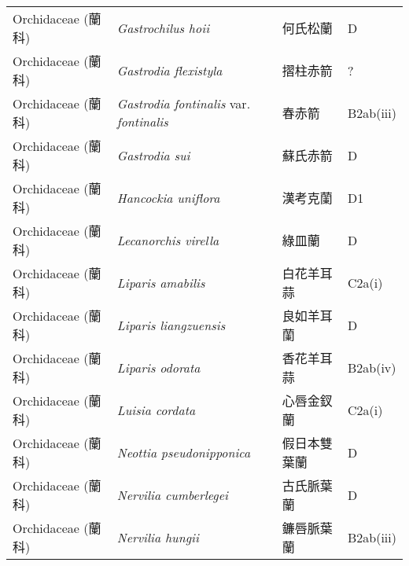 \begin{longtable}{p{3cm}p{5cm}p{3cm}p{4cm}}
    Orchidaceae (蘭科) & \textit{Gastrochilus hoii}  & 何氏松蘭 & D \index{Gastrochilus@\textit{Gastrochilus}!hoii@\textit{hoii}}  \index{何氏松蘭} \\
    Orchidaceae (蘭科) & \textit{Gastrodia flexistyla}  & 摺柱赤箭 & ? \index{Gastrodia@\textit{Gastrodia}!flexistyla@\textit{flexistyla}}  \index{摺柱赤箭} \\
    Orchidaceae (蘭科) & \textit{Gastrodia fontinalis} var. \textit{fontinalis}  & 春赤箭 & B2ab(iii) \index{Gastrodia@\textit{Gastrodia}!fontinalis@\textit{fontinalis}!var. fontinalis@var. \textit{fontinalis}}  \index{春赤箭} \\
    Orchidaceae (蘭科) & \textit{Gastrodia sui}  & 蘇氏赤箭 & D \index{Gastrodia@\textit{Gastrodia}!sui@\textit{sui}}  \index{蘇氏赤箭} \\
    Orchidaceae (蘭科) & \textit{Hancockia uniflora}  & 漢考克蘭 & D1 \index{Hancockia@\textit{Hancockia}!uniflora@\textit{uniflora}}  \index{漢考克蘭} \\
    Orchidaceae (蘭科) & \textit{Lecanorchis virella}  & 綠皿蘭 & D \index{Lecanorchis@\textit{Lecanorchis}!virella@\textit{virella}}  \index{綠皿蘭} \\
    Orchidaceae (蘭科) & \textit{Liparis amabilis}  & 白花羊耳蒜 & C2a(i) \index{Liparis@\textit{Liparis}!amabilis@\textit{amabilis}}  \index{白花羊耳蒜} \\
    Orchidaceae (蘭科) & \textit{Liparis liangzuensis}  & 良如羊耳蘭 & D \index{Liparis@\textit{Liparis}!liangzuensis@\textit{liangzuensis}}  \index{良如羊耳蘭} \\
    Orchidaceae (蘭科) & \textit{Liparis odorata}  & 香花羊耳蒜 & B2ab(iv) \index{Liparis@\textit{Liparis}!odorata@\textit{odorata}}  \index{香花羊耳蒜} \\
    Orchidaceae (蘭科) & \textit{Luisia cordata}  & 心唇金釵蘭 & C2a(i) \index{Luisia@\textit{Luisia}!cordata@\textit{cordata}}  \index{心唇金釵蘭} \\
    Orchidaceae (蘭科) & \textit{Neottia pseudonipponica}  & 假日本雙葉蘭 & D \index{Neottia@\textit{Neottia}!pseudonipponica@\textit{pseudonipponica}}  \index{假日本雙葉蘭} \\
    Orchidaceae (蘭科) & \textit{Nervilia cumberlegei}  & 古氏脈葉蘭 & D \index{Nervilia@\textit{Nervilia}!cumberlegei@\textit{cumberlegei}}  \index{古氏脈葉蘭} \\
    Orchidaceae (蘭科) & \textit{Nervilia hungii}  & 鐮唇脈葉蘭 & B2ab(iii) \index{Nervilia@\textit{Nervilia}!hungii@\textit{hungii}}  \index{鐮唇脈葉蘭} \\

\end{longtable}
